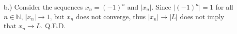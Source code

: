 \documentclass[12pt]{article}
\begin{document}
\begin{itemize}
\begin{itemize}
        \item [b.)] Consider the sequences $x_n=(-1)^n$ and $\vert x_n\vert$. Since $\vert(-1)^n\vert=1$ for all $n\in\mathbb{N}$, $\vert x_n\vert\to1$, but $x_n$ does not converge, thus $\vert x_n\vert\to\vert L\vert$ does not imply that $x_n\to L$. Q.E.D.
    \end{itemize}

\end{itemize}
\end{document}
